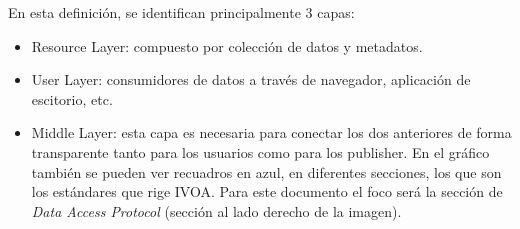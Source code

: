 En esta definición, se identifican principalmente 3 capas:
\begin{itemize}
	\item Resource Layer: compuesto por colección de datos y metadatos.
	\item User Layer: consumidores de datos a través de navegador,
aplicación de escitorio, etc.
	\item Middle Layer: esta capa es necesaria para conectar los dos
anteriores de forma transparente tanto para los usuarios como para los
publisher. En el gráfico también se pueden ver recuadros en azul, en diferentes
secciones, los que son los estándares que rige IVOA. Para este documento el
foco será la sección de \emph{Data Access Protocol} (sección al lado derecho de
la imagen).
\end{itemize}


